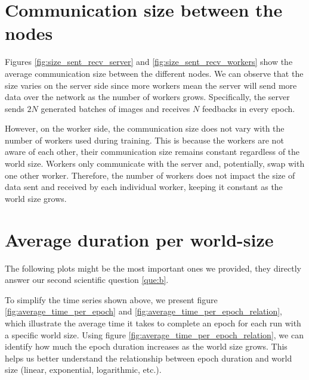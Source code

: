 \newpage
\section{Communication size between the nodes}
Figures \ref{fig:size_sent_recv_server} and \ref{fig:size_sent_recv_workers} show the average communication size between the different nodes. We can observe that the size varies on the server side since more workers mean the server will send more data over the network as the number of workers grows. Specifically, the server sends $2N$ generated batches of images and receives $N$ feedbacks in every epoch.

However, on the worker side, the communication size does not vary with the number of workers used during training. This is because the workers are not aware of each other, their communication size remains constant regardless of the world size. Workers only communicate with the server and, potentially, swap with one other worker. Therefore, the number of workers does not impact the size of data sent and received by each individual worker, keeping it constant as the world size grows.

\newpage
\section{Average duration per world-size}
The following plots might be the most important ones we provided, they directly answer our second scientific question \ref{que:b}.

To simplify the time series shown above, we present figure \ref{fig:average_time_per_epoch} and \ref{fig:average_time_per_epoch_relation}, which illustrate the average time it takes to complete an epoch for each run with a specific world size. Using figure \ref{fig:average_time_per_epoch_relation}, we can identify how much the epoch duration increases as the world size grows. This helps us better understand the relationship between epoch duration and world size (linear, exponential, logarithmic, etc.).


